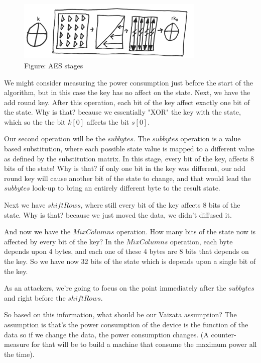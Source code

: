 \begin{figure}[H]
\centering
\includegraphics[width=0.8\textwidth]{images/Lecture6/AES-stages-figure.png}
\caption{Figure: AES stages}
\label{fig:DPA_Illustration}
\end{figure}

We might consider measuring the power consumption just before the start of the algorithm, but in this case the key has no affect on the state. 
Next, we have the add round key. After this operation, each bit of the key affect exactly one bit of the state. Why is that? because we essentially "XOR" the key with the state, which so the the bit $k[0]$ affects the bit $s[0]$.

Our second operation will be the $subbytes$. The $subbytes$ operation is a value based substitution, where each possible state value is mapped to a different value as defined by the substitution matrix. In this stage, every bit of the key, affects 8 bits of the state! Why is that? if only one bit in the key was different, our add round key will cause another bit of the state to change, and that would lead the $subbytes$ look-up to bring an entirely different byte to the result state.

Next we have $shiftRows$, where still every bit of the key affects 8 bits of the state. Why is that? because we just moved the data, we didn't diffused it.

And now we have the $MixColumns$ operation. How many bits of the state now is affected by every bit of the key? In the $MixColumns$ operation, each byte depends upon 4 bytes, and each one of these 4 bytes are 8 bits that depends on the key. So we have now 32 bits of the state which is depends upon a single bit of the key.

As an attackers, we're going to focus on the point immediately after the $subbytes$ and right before the $shiftRows$. 

So based on this information, what should be our Vaizata assumption?
The assumption is that's the power consumption of the device is the function of the data so if we change the data, the power consumption changes. (A counter-measure for that will be to build a machine that consume the maximum power all the time).

